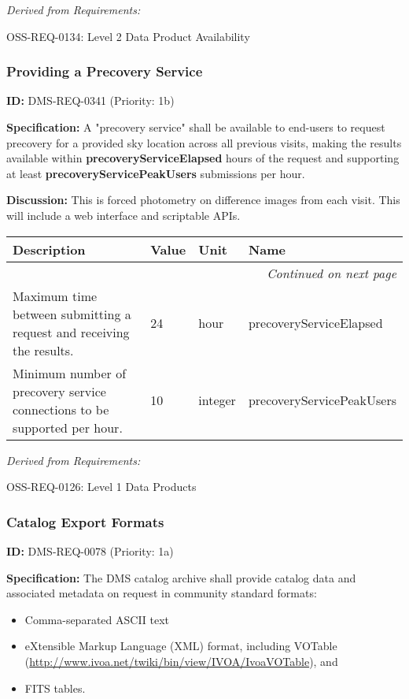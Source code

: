 \documentclass[SE,toc,lsstdraft]{lsstdoc}
\makeatletter
\newcommand{\paramname}[1]{\hspace{0pt}#1}
\newcommand{\unitname}[1]{\hspace{0pt}#1}
\newenvironment{parameters}[0]{%
\setlength\LTleft{0pt}
\setlength\LTright{\fill}
\begin{small}
\begin{longtable}[]{|p{0.49\textwidth}|l|p{0.6in}|p{1.70in}@{}|}

\hline \textbf{Description} & \textbf{Value} & \textbf{Unit} & \textbf{Name} \\ \hline
\endhead

\hline \multicolumn{4}{r}{\emph{Continued on next page}} \\
\endfoot

\hline\hline
\endlastfoot
}{%
\hline
\end{longtable}
\end{small}
}
\makeatother
\begin{document}
\emph{Derived from Requirements:}

OSS-REQ-0134:
Level 2 Data Product Availability \newline

\subsubsection{Providing a Precovery Service}

\label{DMS-REQ-0341}
\textbf{ID:} DMS-REQ-0341 (Priority: 1b)

\textbf{Specification:} A "precovery service" shall be available to end-users to request precovery for a provided sky location across all previous visits, making the results available within \textbf{precoveryServiceElapsed} hours of the request and supporting at least\textbf{ precoveryServicePeakUsers} submissions per hour.

\textbf{Discussion:} This is forced photometry on difference images from each visit. This will include a web interface and scriptable APIs.

\begin{parameters}
Maximum time between submitting a request and receiving the results.
&
24
&
\unitname{%
hour
}
&
\paramname{%
precoveryServiceElapsed
} \\\hline
Minimum number of precovery service connections to be supported per hour.
&
10
&
\unitname{%
integer
}
&
\paramname{%
precoveryServicePeakUsers
} \\\hline
\end{parameters}

\emph{Derived from Requirements:}

OSS-REQ-0126:
Level 1 Data Products \newline

\subsubsection{Catalog Export Formats}

\label{DMS-REQ-0078}
\textbf{ID:} DMS-REQ-0078 (Priority: 1a)

\textbf{Specification:} The DMS catalog archive shall provide catalog data and associated metadata on request in community standard formats:
\begin{itemize}
\item Comma-separated ASCII text
\item eXtensible Markup Language (XML) format, including VOTable
   (\url{http://www.ivoa.net/twiki/bin/view/IVOA/IvoaVOTable}), and
\item FITS tables.
\end{itemize}
\end{document}
